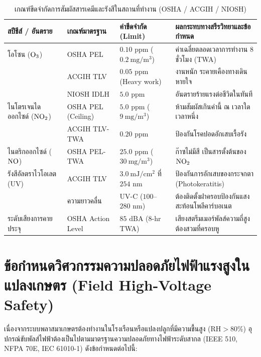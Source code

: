 \begin{table}[H]
\centering
\caption{เกณฑ์ขีดจำกัดการสัมผัสสารเคมีและรังสีในสถานที่ทำงาน (OSHA / ACGIH / NIOSH)}
\label{tab:app_oel_limits}
\begin{tabularx}{\textwidth}{l l l X}
\toprule
\textbf{สปีชีส์ / อันตราย} & \textbf{เกณฑ์มาตรฐาน} & \textbf{ค่าขีดจำกัด (Limit)} & \textbf{ผลกระทบทางสรีรวิทยาและข้อกำหนด} \\
\midrule
โอโซน ($\ce{O3}$) & OSHA PEL & $0.10\text{ ppm}$ ($0.2\ \si{\milli\gram\per\meter\cubed}$) & ค่าเฉลี่ยตลอดเวลาการทำงาน 8 ชั่วโมง (TWA) \\
& ACGIH TLV & $0.05\text{ ppm}$ (Heavy work) & งานหนัก ระคายเคืองทางเดินหายใจ \\
& NIOSH IDLH & $5.0\text{ ppm}$ & อันตรายร้ายแรงต่อชีวิตในทันที \\
\midrule
ไนโตรเจนไดออกไซด์ ($\ce{NO2}$) & OSHA PEL (Ceiling) & $5.0\text{ ppm}$ ($9\ \si{\milli\gram\per\meter\cubed}$) & ห้ามสัมผัสเกินค่านี้ ณ เวลาใดเวลาหนึ่ง \\
& ACGIH TLV-TWA & $0.20\text{ ppm}$ & ป้องกันโรคปอดอักเสบเรื้อรัง \\
\midrule
ไนตริกออกไซด์ ($\ce{NO}$) & OSHA PEL-TWA & $25.0\text{ ppm}$ ($30\ \si{\milli\gram\per\meter\cubed}$) & ก๊าซไม่มีสี เป็นสารตั้งต้นของ $\ce{NO2}$ \\
\midrule
รังสีอัลตราไวโอเลต (UV) & ACGIH TLV & $3.0\ \si{\milli\joule\per\centi\meter\squared}$ ที่ $254\text{ nm}$ & ป้องกันการอักเสบของกระจกตา (Photokeratitis) \\
& ความยาวคลื่น & UV-C ($100$--$280\text{ nm}$) & ต้องติดตั้งฝาครอบป้องกันแสงสะท้อนโพลีคาร์บอเนต \\
\midrule
ระดับเสียงการคายประจุ & OSHA Action Level & $85\text{ dBA}$ (8-hr TWA) & เสียงสตรีมเมอร์พัลส์ความถี่สูง ต้องสวมที่ครอบหู \\
\bottomrule
\end{tabularx}
\end{table}

\section{ข้อกำหนดวิศวกรรมความปลอดภัยไฟฟ้าแรงสูงในแปลงเกษตร (Field High-Voltage Safety)}
\label{app:sec_hv_safety}

เนื่องจากระบบพลาสมาเกษตรต้องทำงานในโรงเรือนหรือแปลงปลูกที่มีความชื้นสูง ($\text{RH} > 80\%$) อุปกรณ์ขับพัลส์ไฟฟ้าต้องเป็นไปตามมาตรฐานความปลอดภัยทางไฟฟ้าระดับสากล (IEEE 510, NFPA 70E, IEC 61010-1) ดังข้อกำหนดต่อไปนี้:

